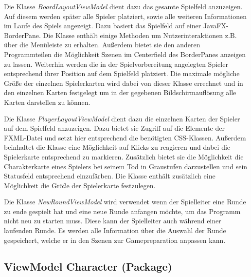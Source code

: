 Die Klasse \emph{BoardLayoutViewModel} dient dazu das gesamte Spielfeld anzuzeigen. Auf diesem werden später alle Spieler platziert, sowie alle weiteren Informationen im Laufe des Spiels angezeigt. Dazu basiert das Spielfeld auf einer JavaFX-BorderPane. Die Klasse enthält einige Methoden um Nutzerinteraktionen z.B. über die Menüleiste zu erhalten. Außerdem bietet sie den anderen Programmteilen die Möglichkeit Szenen im Centerfield des BorderPanes anzeigen zu lassen. Weiterhin werden die in der Spielvorbereitung angelegten Spieler entsprechend ihrer Position auf dem Spielfeld platziert. Die maximale mögliche Größe der einzelnen Spielerkarten wird dabei von dieser Klasse errechnet und in den einzelnen Karten festgelegt um in der gegebenen Bildschirmauflösung alle Karten darstellen zu können.

\medskip
Die Klasse \emph{PlayerLayoutViewModel} dient dazu die einzelnen Karten der Spieler auf dem Spielfeld anzuzeigen. Dazu bietet sie Zugriff auf die Elemente der FXML-Datei und setzt hier entsprechend die benötigten CSS-Klassen. Außerdem beinhaltet die Klasse eine Möglichkeit auf Klicks zu reagieren und dabei die Spielerkarte entsprechend zu markieren. Zusätzlich bietet sie die Möglichkeit die Charakterkarte eines Spielers bei seinem Tod in Graustufen darzustellen und sein Statusfeld entsprechend einzufärben. Die Klasse enthält zusätzlich eine Möglichkeit die Größe der Spielerkarte festzulegen.

\medskip
Die Klasse \textit{NewRoundViewModel} wird verwendet wenn der Spielleiter eine Runde zu ende gespielt hat und eine neue Runde anfangen möchte, um das Programm nicht neu zu starten muss. Diese kann der Spielleiter auch während einer laufenden Runde. Es werden alle Information über die Auswahl der Runde gespeichert, welche er in den Szenen zur Gamepreparation anpassen kann.
  

\subsection{ViewModel Character (Package)}


